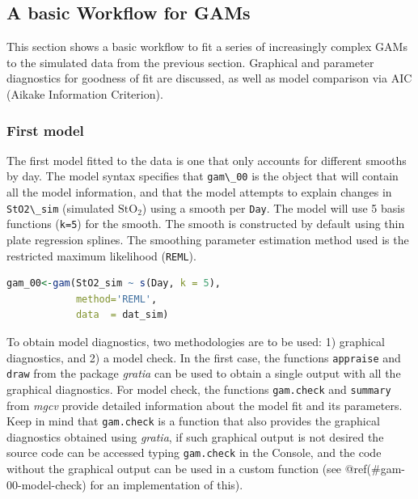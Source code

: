 \documentclass[
]{article}
\newcommand{\passthrough}[1]{#1}
\begin{document}
\hypertarget{workflow}{%
\subsection{A basic Workflow for GAMs}\label{workflow}}

This section shows a basic workflow to fit a series of increasingly complex GAMs to the simulated data from the previous section. Graphical and parameter diagnostics for goodness of fit are discussed, as well as model comparison via AIC (Aikake Information Criterion).

\hypertarget{first-model}{%
\subsubsection{First model}\label{first-model}}

The first model fitted to the data is one that only accounts for different smooths by day. The model syntax specifies that \passthrough{\lstinline!gam\_00!} is the object that will contain all the model information, and that the model attempts to explain changes in \passthrough{\lstinline!StO2\_sim!} (simulated \(\mbox{StO}_2\)) using a smooth per \passthrough{\lstinline!Day!}. The model will use 5 basis functions (\passthrough{\lstinline!k=5!}) for the smooth. The smooth is constructed by default using thin plate regression splines. The smoothing parameter estimation method used is the restricted maximum likelihood (\passthrough{\lstinline!REML!}).

\begin{lstlisting}[language=R]
gam_00<-gam(StO2_sim ~ s(Day, k = 5),
            method='REML',
            data  = dat_sim)
\end{lstlisting}

To obtain model diagnostics, two methodologies are to be used: 1) graphical diagnostics, and 2) a model check. In the first case, the functions \passthrough{\lstinline!appraise!} and \passthrough{\lstinline!draw!} from the package \emph{gratia} can be used to obtain a single output with all the graphical diagnostics. For model check, the functions \passthrough{\lstinline!gam.check!} and \passthrough{\lstinline!summary!} from \emph{mgcv} provide detailed information about the model fit and its parameters. Keep in mind that \passthrough{\lstinline!gam.check!} is a function that also provides the graphical diagnostics obtained using \emph{gratia}, if such graphical output is not desired the source code can be accessed typing \passthrough{\lstinline!gam.check!} in the Console, and the code without the graphical output can be used in a custom function (see @ref(\#gam-00-model-check) for an implementation of this).
\end{document}
